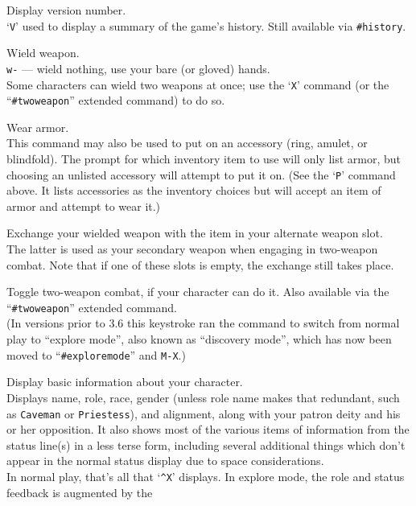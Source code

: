 \documentclass[titlepage]{article}
\begin{document}
\begin{description}[font=\mdseries\ttfamily]
\item[V]
Display version number.
\\
`\texttt{V}' used to display a summary of the game's history.
Still available via \texttt{\#history}.
\item[w]
Wield weapon.\\
\texttt{w-} --- wield nothing, use your bare (or gloved) hands.\\
Some characters can wield two weapons at once; use the `\texttt{X}' command
(or the ``\texttt{\#twoweapon}'' extended command) to do so.
\item[W]
Wear armor.\\
This command may also be used to put on an accessory (ring, amulet, or
blindfold).  The prompt for which inventory item to use will only list
armor, but choosing an unlisted accessory will attempt to put it on.
(See the `\texttt{P}' command above.  It lists accessories as the inventory
choices but will accept an item of armor and attempt to wear it.)
\item[x]
Exchange your wielded weapon with the item in your alternate weapon slot.\\
The latter is used as your secondary weapon when engaging in
two-weapon combat.  Note that if one of these slots is empty,
the exchange still takes place.
\item[X]
Toggle two-weapon combat, if your character can do it.  Also available
via the ``\texttt{\#twoweapon}'' extended command.\\
(In versions prior to 3.6 this keystroke ran the command to switch from normal
play to ``explore mode'', also known as ``discovery mode'', which has now
been moved to ``\texttt{\#exploremode}'' and \texttt{M-X}.)
\item[\textasciicircum X]
Display basic information about your character.\\
Displays name, role, race, gender (unless role name makes that
redundant, such as \texttt{Caveman} or \texttt{Priestess}), and alignment,
along with your patron deity and his or her opposition.  It also
shows most of the various items of information from the status line(s)
in a less terse form, including several additional things which don't
appear in the normal status display due to space considerations.\\
In normal play, that's all that `\texttt{\textasciicircum X}' displays.
In explore mode, the role and status feedback is augmented by the

\end{description}
\end{document}
